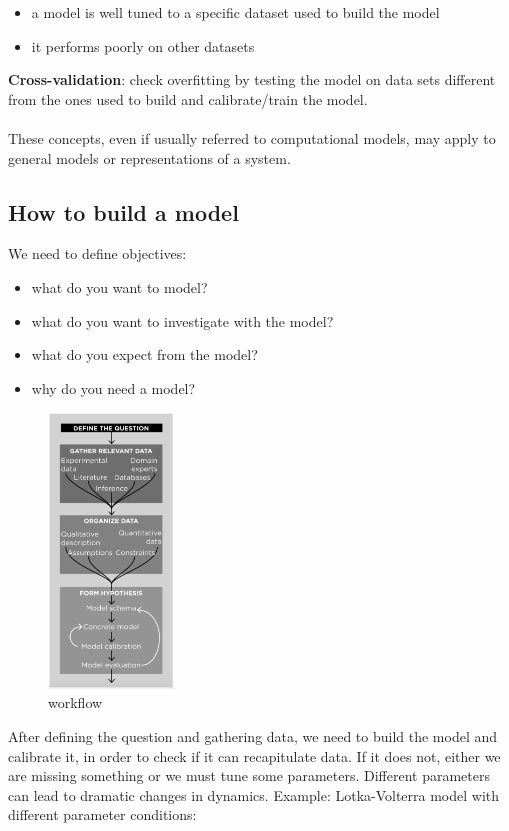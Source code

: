 \begin{itemize}
\tightlist
\item
  a model is well tuned to a specific dataset used to build the model
\item
  it performs poorly on other datasets
\end{itemize}
\noindent
\textbf{Cross-validation}: check overfitting by testing the model on
data sets different from the ones used to build and calibrate/train the
model.
\\
\\
\noindent
These concepts, even if usually referred to computational models, may
apply to general models or representations of a system.


\subsection{How to build a model}

We need to define objectives:

\begin{itemize}
\tightlist
\item
  what do you want to model?
\item
  what do you want to investigate with the model?
\item
  what do you expect from the model?
\item
  why do you need a model?
\end{itemize}

\begin{figure}
\centering
\includegraphics[width=0.3\textwidth]{workflow.png}
\caption{workflow}
\end{figure}
\noindent
After defining the question and gathering data, we need to build the
model and calibrate it, in order to check if it can recapitulate data.
If it does not, either we are missing something or we must tune some
parameters. Different parameters can lead to dramatic changes in
dynamics. Example: Lotka-Volterra model with different parameter
conditions:

